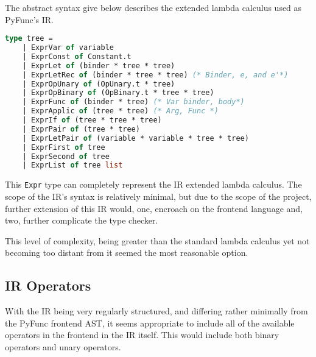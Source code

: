 \documentclass{l4proj}
\begin{document}
The abstract syntax give below describes the extended lambda calculus used as PyFunc's IR.

\begin{lstlisting}[language=Caml, caption=The Abstract Syntax for the IR]
type tree = 
    | ExprVar of variable
    | ExprConst of Constant.t
    | ExprLet of (binder * tree * tree)
    | ExprLetRec of (binder * tree * tree) (* Binder, e, and e'*)
    | ExprOpUnary of (OpUnary.t * tree)
    | ExprOpBinary of (OpBinary.t * tree * tree)
    | ExprFunc of (binder * tree) (* Var binder, body*)
    | ExprApplic of (tree * tree) (* Arg, Func *)
    | ExprIf of (tree * tree * tree)
    | ExprPair of (tree * tree)
    | ExprLetPair of (variable * variable * tree * tree)
    | ExprFirst of tree
    | ExprSecond of tree
    | ExprList of tree list
\end{lstlisting}


This \texttt{Expr} type can completely represent the IR extended lambda calculus. 
The scope of the IR's syntax is relatively minimal, but due to the scope of the project, further extension of this IR would, one, encroach on the frontend language and, two, further complicate the type checker.

This level of complexity, being greater than the standard lambda calculus yet not becoming too distant from it seemed the most reasonable option.

\subsection*{IR Operators}
With the IR being very regularly structured, and differing rather minimally from the PyFunc frontend AST, it seems appropriate to include all of the available operators in the frontend in the IR itself.
This would include both binary operators and unary operators.
\end{document}
